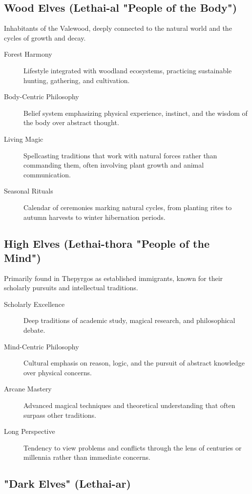 \subsection*{Wood Elves (Lethai-al "People of the Body")}

Inhabitants of the Valewood, deeply connected to the natural world and the cycles of growth and decay.

\begin{description}
\item[Forest Harmony] Lifestyle integrated with woodland ecosystems, practicing sustainable hunting, gathering, and cultivation.
\item[Body-Centric Philosophy] Belief system emphasizing physical experience, instinct, and the wisdom of the body over abstract thought.
\item[Living Magic] Spellcasting traditions that work with natural forces rather than commanding them, often involving plant growth and animal communication.
\item[Seasonal Rituals] Calendar of ceremonies marking natural cycles, from planting rites to autumn harvests to winter hibernation periods.
\end{description}

\subsection*{High Elves (Lethai-thora "People of the Mind")}

Primarily found in Thepyrgos as established immigrants, known for their scholarly pursuits and intellectual traditions.

\begin{description}
\item[Scholarly Excellence] Deep traditions of academic study, magical research, and philosophical debate.
\item[Mind-Centric Philosophy] Cultural emphasis on reason, logic, and the pursuit of abstract knowledge over physical concerns.
\item[Arcane Mastery] Advanced magical techniques and theoretical understanding that often surpass other traditions.
\item[Long Perspective] Tendency to view problems and conflicts through the lens of centuries or millennia rather than immediate concerns.
\end{description}

\subsection*{"Dark Elves" (Lethai-ar)}

